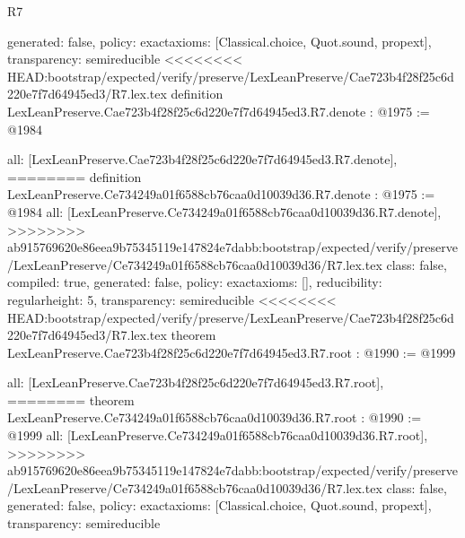 \begin{lexlean}{R7}
\begin{coremodule}
{{{{{{{{{{{{  generated: false,
  policy: exact{axioms: [Classical.choice, Quot.sound, propext]},
  transparency: semireducible
}
<<<<<<<< HEAD:bootstrap/expected/verify/preserve/LexLeanPreserve/Cae723b4f28f25c6d220e7f7d64945ed3/R7.lex.tex
definition LexLeanPreserve.Cae723b4f28f25c6d220e7f7d64945ed3.R7.denote : @1975 := @1984 {
  all: [LexLeanPreserve.Cae723b4f28f25c6d220e7f7d64945ed3.R7.denote],
========
definition LexLeanPreserve.Ce734249a01f6588cb76caa0d10039d36.R7.denote : @1975 := @1984 {
  all: [LexLeanPreserve.Ce734249a01f6588cb76caa0d10039d36.R7.denote],
>>>>>>>> ab915769620e86eea9b75345119e147824e7dabb:bootstrap/expected/verify/preserve/LexLeanPreserve/Ce734249a01f6588cb76caa0d10039d36/R7.lex.tex
  class: false,
  compiled: true,
  generated: false,
  policy: exact{axioms: []},
  reducibility: regular{height: 5},
  transparency: semireducible
}
<<<<<<<< HEAD:bootstrap/expected/verify/preserve/LexLeanPreserve/Cae723b4f28f25c6d220e7f7d64945ed3/R7.lex.tex
theorem LexLeanPreserve.Cae723b4f28f25c6d220e7f7d64945ed3.R7.root : @1990 := @1999 {
  all: [LexLeanPreserve.Cae723b4f28f25c6d220e7f7d64945ed3.R7.root],
========
theorem LexLeanPreserve.Ce734249a01f6588cb76caa0d10039d36.R7.root : @1990 := @1999 {
  all: [LexLeanPreserve.Ce734249a01f6588cb76caa0d10039d36.R7.root],
>>>>>>>> ab915769620e86eea9b75345119e147824e7dabb:bootstrap/expected/verify/preserve/LexLeanPreserve/Ce734249a01f6588cb76caa0d10039d36/R7.lex.tex
  class: false,
  generated: false,
  policy: exact{axioms: [Classical.choice, Quot.sound, propext]},
  transparency: semireducible
}

}}}}}}}}}}}}}
\end{coremodule}
\end{lexlean}
